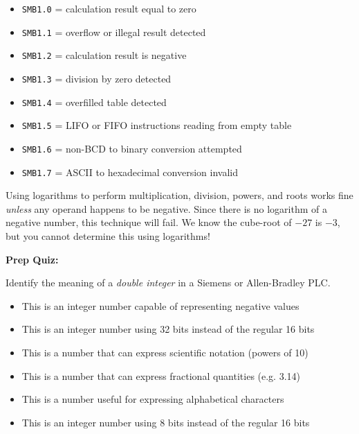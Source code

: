 \begin{itemize}
\item{} {\tt SMB1.0} = calculation result equal to zero
\item{} {\tt SMB1.1} = overflow or illegal result detected
\item{} {\tt SMB1.2} = calculation result is negative
\item{} {\tt SMB1.3} = division by zero detected
\item{} {\tt SMB1.4} = overfilled table detected
\item{} {\tt SMB1.5} = LIFO or FIFO instructions reading from empty table
\item{} {\tt SMB1.6} = non-BCD to binary conversion attempted
\item{} {\tt SMB1.7} = ASCII to hexadecimal conversion invalid
\end{itemize}

\vskip 10pt

Using logarithms to perform multiplication, division, powers, and roots works fine {\it unless} any operand happens to be negative.  Since there is no logarithm of a negative number, this technique will fail.  We know the cube-root of $-27$ is $-3$, but you cannot determine this using logarithms!






\vfil \eject

\noindent
{\bf Prep Quiz:}

Identify the meaning of a {\it double integer} in a Siemens or Allen-Bradley PLC.

\begin{itemize}
\item{} This is an integer number capable of representing negative values
\vskip 5pt 
\item{} This is an integer number using 32 bits instead of the regular 16 bits
\vskip 5pt 
\item{} This is a number that can express scientific notation (powers of 10)
\vskip 5pt 
\item{} This is a number that can express fractional quantities (e.g. 3.14)
\vskip 5pt 
\item{} This is a number useful for expressing alphabetical characters
\vskip 5pt 
\item{} This is an integer number using 8 bits instead of the regular 16 bits
\end{itemize}




